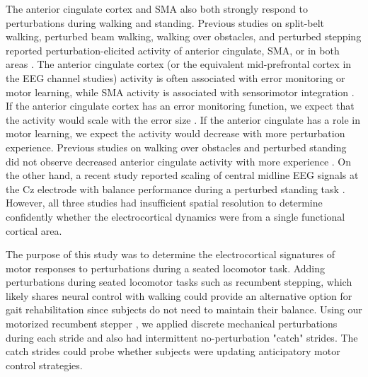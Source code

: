 \documentclass[../thesis_seyed.tex]{subfiles}
\begin{document}
The anterior cingulate cortex and SMA also both strongly respond to perturbations during walking and standing. Previous studies on split-belt walking, perturbed beam walking, walking over obstacles, and perturbed stepping reported perturbation-elicited activity of anterior cingulate, SMA, or in both areas \cite{Haefeli2011-ym,Bulea2015-dv,Marchal-Crespo2017-fn,Peterson2018-ht,Hinton2019-gg,Nordin2019-ar}. The anterior cingulate cortex (or the equivalent mid-prefrontal cortex in the EEG channel studies) activity is often associated with error monitoring or motor learning, while SMA activity is associated with sensorimotor integration \cite{Ridderinkhof2004-jx,Galea2011-jf,Peterson2018-ht}. If the anterior cingulate cortex has an error monitoring function, we expect that the activity would scale with the error size \cite{Arrighi2016-yb}. If the anterior cingulate has a role in motor learning, we expect the activity would decrease with more perturbation experience. Previous studies on walking over obstacles and perturbed standing did not observe decreased anterior cingulate activity with more experience \cite{Haefeli2011-ym,Mierau2015-fd}. On the other hand, a recent study reported scaling of central midline EEG signals at the Cz electrode with balance performance during a perturbed standing task \cite{Payne2020-hl}. However, all three studies had insufficient spatial resolution to determine confidently whether the electrocortical dynamics were from a single functional cortical area.

The purpose of this study was to determine the electrocortical signatures of motor responses to perturbations during a seated locomotor task.
Adding perturbations during seated locomotor tasks such as recumbent stepping, which likely shares neural control with walking \cite{Stoloff2007-da,Zehr2007-ww} could provide an alternative option for gait rehabilitation since subjects do not need to maintain their balance. Using our motorized recumbent stepper \cite{Huang2009-of}, we applied discrete mechanical perturbations during each stride and also had intermittent no-perturbation "catch" strides. The catch strides could probe whether subjects were updating anticipatory motor control strategies.
\end{document}
